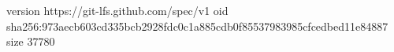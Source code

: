 version https://git-lfs.github.com/spec/v1
oid sha256:973aecb603cd335bcb2928fdc0c1a885cdb0f85537983985cfcedbed11e84887
size 37780
